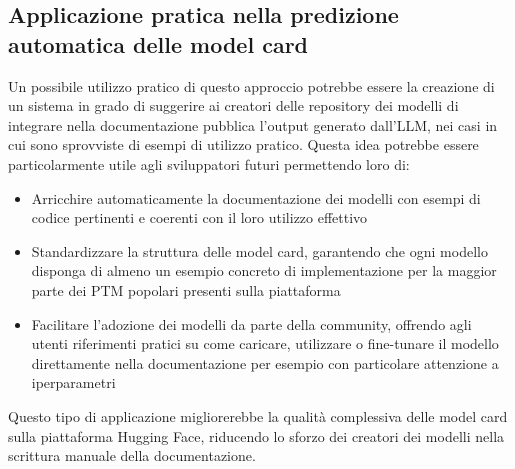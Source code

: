 \documentclass{article}
\begin{document}
\subsection{Applicazione pratica nella predizione automatica delle model card}
Un possibile utilizzo pratico di questo approccio potrebbe essere la creazione di un sistema in grado di suggerire ai creatori delle repository dei modelli di integrare nella documentazione pubblica l'output generato dall'LLM, nei casi in cui sono sprovviste di esempi di utilizzo pratico.
Questa idea potrebbe essere particolarmente utile agli sviluppatori futuri permettendo loro di:
\begin{itemize}
    \item Arricchire automaticamente la documentazione dei modelli con esempi di codice pertinenti e coerenti con il loro utilizzo effettivo
    \item Standardizzare la struttura delle model card, garantendo che ogni modello disponga di almeno un esempio concreto di implementazione per la maggior parte dei PTM popolari presenti sulla piattaforma
    \item Facilitare l’adozione dei modelli da parte della community, offrendo agli utenti riferimenti pratici su come caricare, utilizzare o fine-tunare il modello direttamente nella documentazione per esempio con particolare attenzione a iperparametri
\end{itemize}
Questo tipo di applicazione migliorerebbe la qualità complessiva delle model card sulla piattaforma Hugging Face, riducendo lo sforzo dei creatori dei modelli nella scrittura manuale della documentazione.



\appendix
\end{document}
